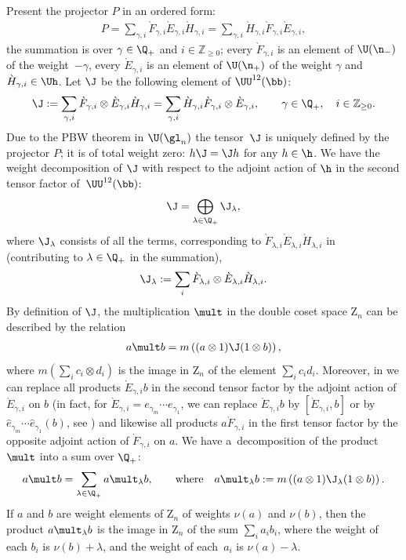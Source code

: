 \documentclass[11pt]{article}
\def\UUb{\UU^{12}(\bb)}\def\V{\mathrm {V}}\def\ve{\varepsilon}\def\Z{\mathrm{Z}}\def\SZ{\mathrm{SZ}}
\numberwithin{equation}{section}
\begin{document}
Present the projector $P$ in an ordered form:
\begin{gather} \label{proof1}
P=
\sum_{\gamma,i}\grave{F}_{\gamma,i}\grave{E}_{\gamma,i}\grave{H}_{\gamma,i}=
\sum_{\gamma,i}\grave{H}_{\gamma,i}\grave{F}_{\gamma,i}\grave{E}_{\gamma,i}  ,
\end{gather}
the summation is over $\gamma\in\Q_+$ and $i\in {\mathbb{Z}}_{\geq 0}$;
every $\grave{F}_{\gamma,i}$ is an element of $\U(\n_-)$ of the weight~$-\gamma$, every
$\grave{E}_{\gamma,i}$ is an element of $\U(\n_+)$ of the weight $\gamma$ and
$\grave{H}_{\gamma,i}\in\Uh$. Let $\J$ be the following element of $\UUb$:
\begin{gather*}
\J :=\sum_{\gamma,i}\grave{F}_{\gamma,i}\otimes\grave{E}_{\gamma,i}\grave{H}_{\gamma,i}=
\sum_{\gamma,i}\grave{H}_{\gamma,i}\grave{F}_{\gamma,i}\otimes\grave{E}_{\gamma,i}  ,\qquad \gamma\in\Q_+  ,\quad i\in {\mathbb{Z}}_{\geq 0}  .
\end{gather*}
Due to the PBW theorem in $\U(\gl_n)$ the tensor~$\J$ is uniquely def\/ined by the projector $P$; it is
of total weight zero: $h\J=\J h$ for any $h\in\h$. We have the weight decomposition of $\J$ with
respect to the adjoint action of $\h$ in the second tensor factor of~$\UUb$:
\begin{gather*}
\J= \bigoplus_{\lambda\in\Q_+}\J_\lambda  ,
\end{gather*}
where $\J_\lambda$ consists of all the terms, corresponding to $\grave{F}_{\lambda,i}\grave{E}_{\lambda,i}
\grave{H}_{\lambda,i}$ in~
(contributing to $\lambda\in\Q_+$ in the summation),
\begin{gather*}
\J_\lambda :=\sum_i\grave{F}_{\lambda,i}\otimes\grave{E}_{\lambda,i}\grave{H}_{\lambda,i}  .
\end{gather*}
By def\/inition of $\J$, the multiplication $\mult$ in the double coset space $\Z_n$ can be described by the relation
\begin{gather}\label{proof4}
a\mult b= m\left( (a\otimes 1)\J (1\otimes b )\right),
\end{gather}
where $m(\sum_ic_i\otimes d_i)$ is the image in $\Z_n$ of the element $\sum_ic_id_i$.
Moreover, in  we can replace all products $\grave{E}_{\gamma,i}b$ in the second tensor
factor by the adjoint action of $\grave{E}_{\gamma,i}$ on $b$ (in fact, for $\grave{E}_{\gamma,i}=e_{\gamma_m}\cdots e_{\gamma_1}$,
we can replace $\grave{E}_{\gamma,i}b$ by $[\grave{E}_{\gamma,i},b]$ or by $\hat{e}_{\gamma_m}\cdots \hat{e}_{\gamma_1}(b)$,
see ) and likewise all products $a\grave{F}_{\gamma,i}$
in the f\/irst tensor factor by the opposite adjoint action of $\grave{F}_{\gamma,i}$ on $a$.
We have a~decomposition of the product $\mult$ into a sum over $\Q_+$:
\begin{gather}\label{proof5}
a\mult b=\sum_{\lambda\in\Q_+}a\mult_\lambda b  ,\qquad\text{where}\quad
a\mult_\lambda b:=m\left( (a\otimes 1)  \J_\lambda (1\otimes b )\right)  .
\end{gather}
If $a$ and $b$ are weight elements of $\Z_n$ of weights $\nu(a)$ and $\nu(b)$, then the product
$a\mult_\lambda b$ is the image in $\Z_n$ of the sum $\sum_i a_ib_i$, where the weight of each
$b_i$ is $\nu(b)+\lambda$, and the weight of each~$a_i$ is $\nu(a)-\lambda$.
\end{document}
